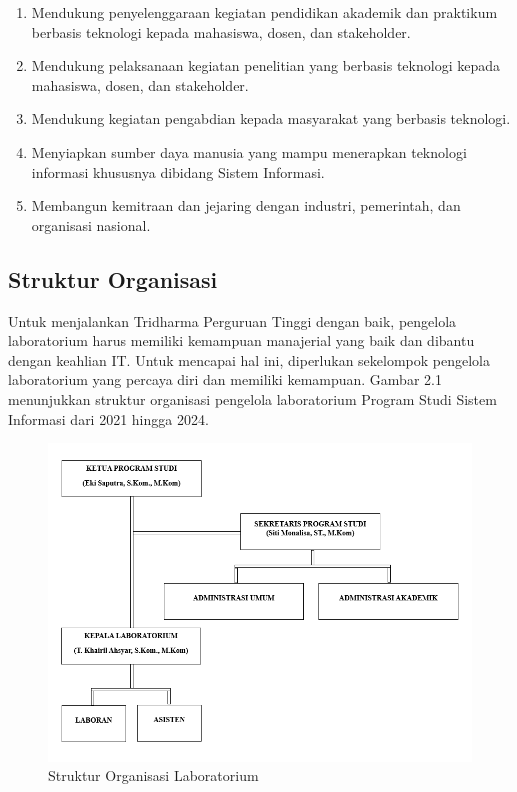 \begin{enumerate}

  \item Mendukung penyelenggaraan kegiatan pendidikan akademik dan praktikum berbasis teknologi kepada mahasiswa, dosen, dan stakeholder.
  \item Mendukung pelaksanaan kegiatan penelitian yang berbasis teknologi kepada mahasiswa, dosen, dan stakeholder.
  \item Mendukung kegiatan pengabdian kepada masyarakat yang berbasis teknologi.
  \item Menyiapkan sumber daya manusia yang mampu menerapkan teknologi informasi khususnya dibidang Sistem Informasi.
  \item Membangun kemitraan dan jejaring dengan industri, pemerintah, dan organisasi nasional.

\end{enumerate}
\subsection{Struktur Organisasi}
Untuk menjalankan Tridharma Perguruan Tinggi dengan baik, pengelola laboratorium harus memiliki kemampuan manajerial yang baik dan dibantu dengan keahlian IT. Untuk mencapai hal ini, diperlukan sekelompok pengelola laboratorium yang percaya diri dan memiliki kemampuan. Gambar 2.1 menunjukkan struktur organisasi pengelola laboratorium Program Studi Sistem Informasi dari 2021 hingga 2024.

\begin{figure}
  \centering
  \includegraphics[width=0.82\linewidth]{konten//gambar/Struktur Organisasi.png}
  \caption{Struktur Organisasi Laboratorium}
  \label{fig:enter-label}
\end{figure}

